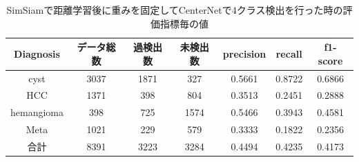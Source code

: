 \documentclass[a4j]{ujarticle}
\begin{document}
\begin{itemize}
            \begin{table}[!h]
                \centering
                \caption{SimSiam\cite{simsiam}で距離学習後に重みを固定してCenterNet\cite{centernet}で4クラス検出を行った時の評価指標毎の値}
                \label{tab:metric_center_flex}
                \begin{tabular}{c|ccc|ccc}
                    Diagnosis & データ総数 & 過検出数 & 未検出数 & precision & recall & f1-score \\ \hline
                    cyst & 3037 & 1871 & 327 & 0.5661 & 0.8722 & 0.6866 \\
                    HCC & 1371 & 398 & 804 & 0.3513 & 0.2451 & 0.2888 \\
                    hemangioma & 398 & 725 & 1574 & 0.5466 & 0.3943 & 0.4581 \\
                    Meta & 1021 & 229 & 579 & 0.3333 & 0.1822 & 0.2356 \\ \hline
                    合計 & 8391 & 3223 & 3284 & 0.4494 & 0.4235 & 0.4173
                \end{tabular}
            \end{table}


\end{itemize}
\end{document}
